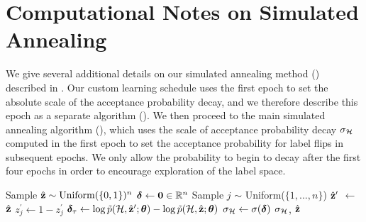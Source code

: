 \documentclass[aps,pre,reprint,superscriptaddress,nofootinbib]{revtex4-2}
\begin{document}
\raggedbottom


    \section{Computational Notes on Simulated Annealing}\label{sec:simulated-annealing-algorithm-spec}
        We give several additional details on our simulated annealing method () described in . 
        Our custom learning schedule uses the first epoch to set the absolute scale of the acceptance probability decay, and we therefore describe this epoch as a separate algorithm ().
        We then proceed to the main simulated annealing algorithm (), which uses the scale of acceptance probability decay $\sigma_{\mathcal{H}}$ computed in the first epoch to set the acceptance probability for label flips in subsequent epochs.
        We only allow the probability to begin to decay after the first four epochs in order to encourage exploration of the label space. 
        
        \begin{algorithm}[H]
            \begin{algorithmic}
                \caption{\texttt{SimulatedAnnealingFirstEpoch}$(\hypergraph, \paramvector)$}\label{algocf:simulated_annealing_first_epoch}
                \State Sample $\hat{\mathbf{z}} \sim \text{Uniform}(\{0,1\})^{n}$ 
                \State $\boldsymbol{\delta} \gets \mathbf{0} \in \mathbb{R}^n$ 
                    \State Sample $j$ $\sim$ Uniform($\{1,...,n\}$)
                    \State $\hat{\mathbf{z}}^\prime$ $\gets$ $\hat{\mathbf{z}}$
                    \State $z^\prime_j\gets1-z^\prime_j$
                    \State $\boldsymbol{\delta}_\tau \gets \log \tilde{p}(\mathcal{H}, \hat{\mathbf{z}}^\prime ; \boldsymbol{\theta}) - \log \tilde{p}(\mathcal{H}, \hat{\mathbf{z}} ; \boldsymbol{\theta})$ 
                \EndFor
                \State $\sigma_{\mathcal{H}}\gets \sigma(\boldsymbol{\delta})$
                \State \Return $\sigma_{\mathcal{H}}$, $\hat{\mathbf{z}}$
            \end{algorithmic}
        \end{algorithm}
\end{document}
